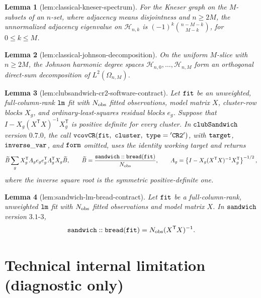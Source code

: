 \documentclass{article}
\newtheorem{lemma}{Lemma}
\begin{document}
\begin{lemma}[lem:classical-kneser-spectrum]\label{lem:classical-kneser-spectrum}
For the Kneser graph on the \(M\)-subsets of an \(n\)-set, where adjacency means disjointness and \(n\ge2M\), the unnormalized adjacency eigenvalue on \(\mathcal H_{n,k}\) is \((-1)^k\binom{n-M-k}{M-k}\), for \(0\le k\le M\).
\end{lemma}

\begin{lemma}[lem:classical-johnson-decomposition]\label{lem:classical-johnson-decomposition}
On the uniform \(M\)-slice with \(n\ge2M\), the Johnson harmonic degree spaces \(\mathcal H_{n,0},\ldots,\mathcal H_{n,M}\) form an orthogonal direct-sum decomposition of \(L^2(\Omega_{n,M})\).
\end{lemma}

\begin{lemma}[lem:clubsandwich-cr2-software-contract]\label{lem:clubsandwich-cr2-software-contract}
Let \({\tt fit}\) be an unweighted, full-column-rank \({\tt lm}\) fit with \(N_{\rm obs}\) fitted observations, model matrix \(X\), cluster-row blocks \(X_g\), and ordinary-least-squares residual blocks \(e_g\).  Suppose that \(I-X_g(X^{\mathsf T}X)^{-1}X_g^{\mathsf T}\) is positive definite for every cluster.  In \({\tt clubSandwich}\) version \(0.7.0\), the call \({\tt vcovCR}({\tt fit},\ {\tt cluster},\ {\tt type}={\tt 'CR2'})\), with \({\tt target}\), \({\tt inverse\_var}\), and \({\tt form}\) omitted, uses the identity working target and returns
\[
 \widetilde B
 \sum_gX_g^{\mathsf T}A_ge_ge_g^{\mathsf T}A_g^{\mathsf T}X_g
 \widetilde B,
 \qquad
 \widetilde B=\frac{{\tt sandwich::bread}({\tt fit})}{N_{\rm obs}},
 \qquad
 A_g=\left\{I-X_g(X^{\mathsf T}X)^{-1}X_g^{\mathsf T}\right\}^{-1/2},
\]
where the inverse square root is the symmetric positive-definite one.
\end{lemma}

\begin{lemma}[lem:sandwich-lm-bread-contract]\label{lem:sandwich-lm-bread-contract}
Let \({\tt fit}\) be a full-column-rank, unweighted \({\tt lm}\) fit with \(N_{\rm obs}\) fitted observations and model matrix \(X\).  In \({\tt sandwich}\) version \(3.1\text{-}3\),
\[
 {\tt sandwich::bread}({\tt fit})=N_{\rm obs}(X^{\mathsf T}X)^{-1}.
\]
\end{lemma}

\section*{Technical internal limitation (diagnostic only)}
\end{document}
